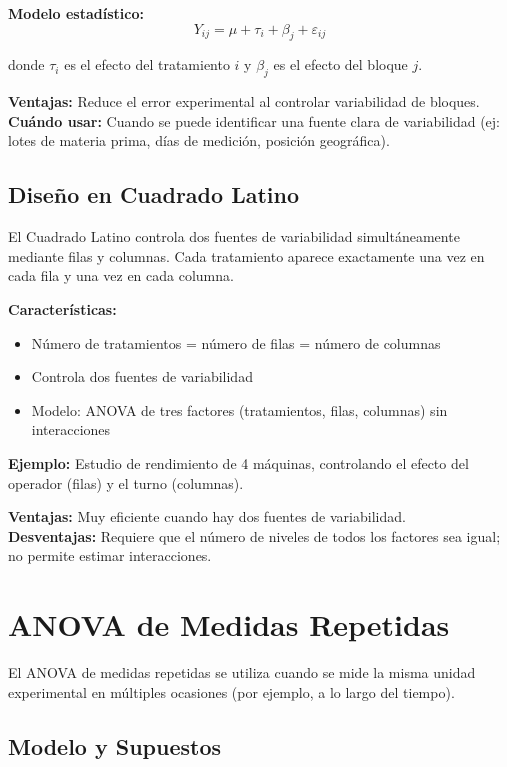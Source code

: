 \documentclass[11pt,a4paper]{article}
\theoremstyle{definition}
\begin{document}
\textbf{Modelo estadístico:}
\begin{equation}
Y_{ij} = \mu + \tau_i + \beta_j + \varepsilon_{ij}
\end{equation}

donde $\tau_i$ es el efecto del tratamiento $i$ y $\beta_j$ es el efecto del bloque $j$.

\textbf{Ventajas:} Reduce el error experimental al controlar variabilidad de bloques. \\
\textbf{Cuándo usar:} Cuando se puede identificar una fuente clara de variabilidad (ej: lotes de materia prima, días de medición, posición geográfica).

\subsection{Diseño en Cuadrado Latino}

El Cuadrado Latino controla dos fuentes de variabilidad simultáneamente mediante filas y columnas. Cada tratamiento aparece exactamente una vez en cada fila y una vez en cada columna.

\textbf{Características:}
\begin{itemize}
    \item Número de tratamientos = número de filas = número de columnas
    \item Controla dos fuentes de variabilidad
    \item Modelo: ANOVA de tres factores (tratamientos, filas, columnas) sin interacciones
\end{itemize}

\textbf{Ejemplo:} Estudio de rendimiento de 4 máquinas, controlando el efecto del operador (filas) y el turno (columnas).

\textbf{Ventajas:} Muy eficiente cuando hay dos fuentes de variabilidad. \\
\textbf{Desventajas:} Requiere que el número de niveles de todos los factores sea igual; no permite estimar interacciones.

\section{ANOVA de Medidas Repetidas}

El ANOVA de medidas repetidas se utiliza cuando se mide la misma unidad experimental en múltiples ocasiones (por ejemplo, a lo largo del tiempo).

\subsection{Modelo y Supuestos}
\end{document}
